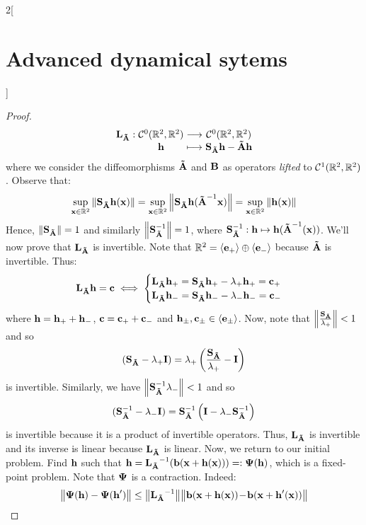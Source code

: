 \documentclass[../../../main_math.tex]{subfiles}
\begin{document}
\begin{multicols}{2}[\section{Advanced dynamical sytems}]
\begin{proof}
\begin{gather*}
      \function{\vf{L}_{\vf{\tilde{A}}}}{\mathcal{C}^0(\RR^2,\RR^2)}{\mathcal{C}^0(\RR^2,\RR^2)}{\vf{h}}{\vf{S}_{\vf{\tilde{A}}}\vf{h}-\vf{\tilde{A}}\vf{h}}
    \end{gather*}
    where we consider the diffeomorphisms $\vf{\tilde{A}}$ and $\vf{B}$ as operators \textit{lifted} to $\mathcal{C}^1(\RR^2,\RR^2)$. Observe that:
    $$
      \sup_{\vf{x}\in \RR^2}\norm{\vf{S}_{\vf{\tilde{A}}}\vf{h}(\vf{x})}=\sup_{\vf{x}\in \RR^2}\norm{\vf{S}_{\vf{\tilde{A}}}\vf{h}(\vf{\tilde{A}}^{-1}\vf{x})}= \sup_{\vf{x}\in \RR^2}\norm{\vf{h}(\vf{x})}
    $$
    Hence, $\norm{\vf{S}_{\vf{\tilde{A}}}}=1$ and similarly $\norm{\vf{S}_{\vf{\tilde{A}}}^{-1}}=1$, where $\vf{S}_{\vf{\tilde{A}}}^{-1}:\vf{h}\mapsto \vf{h}(\vf{\tilde{A}}^{-1}(\vf{x}))$. We'll now prove that $\vf{L}_{\vf{\tilde{A}}}$ is invertible. Note that $\RR^2=\langle \vf{e}_+\rangle \oplus \langle \vf{e}_-\rangle$ because $\vf{\tilde{A}}$ is invertible. Thus:
    $$
      \vf{L}_{\vf{\tilde{A}}}\vf{h}=\vf{c}\iff \begin{cases}
        \vf{L}_{\vf{\tilde{A}}}\vf{h}_+=\vf{S}_{\vf{\tilde{A}}}\vf{h}_+-\lambda_+\vf{h}_+=\vf{c}_+ \\
        \vf{L}_{\vf{\tilde{A}}}\vf{h}_-=\vf{S}_{\vf{\tilde{A}}}\vf{h}_--\lambda_-\vf{h}_-=\vf{c}_-
      \end{cases}
    $$
    where $\vf{h}=\vf{h}_++\vf{h}_-$, $\vf{c}=\vf{c}_++\vf{c}_-$ and $\vf{h}_\pm,\vf{c}_\pm\in \langle \vf{e}_\pm\rangle$. Now, note that $\norm{\frac{\vf{S}_{\vf{\tilde{A}}}}{\lambda_+}}<1$ and so
    $$
      (\vf{S}_{\vf{\tilde{A}}}-\lambda_+\vf{I})=\lambda_+\left(\frac{\vf{S}_{\vf{\tilde{A}}}}{\lambda_+}-\vf{I}\right)
    $$
    is invertible. Similarly, we have $\norm{\vf{S}_{\vf{\tilde{A}}}^{-1}\lambda_-}<1$ and so
    $$
      (\vf{S}_{\vf{\tilde{A}}}^{-1}-\lambda_-\vf{I})=\vf{S}_{\vf{\tilde{A}}}^{-1}\left(\vf{I}-\lambda_-\vf{S}_{\vf{\tilde{A}}}^{-1}\right)
    $$
    is invertible because it is a product of invertible operators. Thus, $\vf{L}_{\vf{\tilde{A}}}$ is invertible and its inverse is linear because $\vf{L}_{\vf{\tilde{A}}}$ is linear. Now, we return to our initial problem. Find $\vf{h}$ such that $\vf{h}= {\vf{L}_{\vf{\tilde{A}}}}^{-1}(\vf{b}(\vf{x}+\vf{h}(\vf{x})))=:\vf\Psi(\vf{h})$, which is a fixed-point problem. Note that $\vf\Psi$ is a contraction. Indeed:
    \begin{align*}
      \norm{\vf\Psi(\vf{h})-\vf\Psi(\vf{h}')} & \leq \norm{{\vf{L}_{\vf{\tilde{A}}}}^{-1}}\!\norm{\vf{b}(\vf{x}+\vf{h}(\vf{x}))\!-\!\vf{b}(\vf{x}+\vf{h}'(\vf{x}))} \\

\end{align*}
\end{proof}
\end{multicols}
\end{document}
